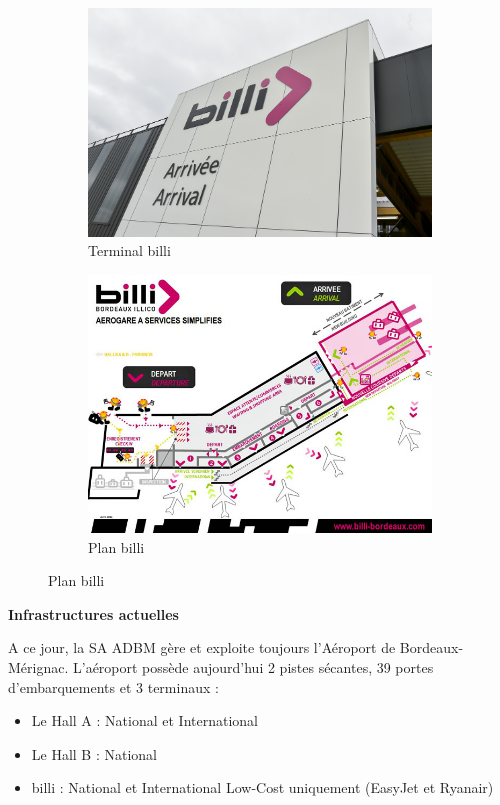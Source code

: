 \begin{figure}[hbt!]
    \begin{subfigure}{.5\textwidth}
      \centering
      \includegraphics[width=.7\linewidth]{Images/billiext.jpg}  
      \caption{Terminal billi}
      \label{fig:billiext}
    \end{subfigure}
    \begin{subfigure}{.5\textwidth}
      \centering
      \includegraphics[width=.7\linewidth]{Images/billi.jpg}  
      \caption{Plan billi}
      \label{fig:planBilli}
    \end{subfigure}
    \label{fig:travaux}
\end{figure}

\newpage

\textbf{Infrastructures actuelles}\newline


A ce jour, la SA ADBM gère et exploite toujours l'Aéroport de Bordeaux-Mérignac.
L'aéroport possède aujourd'hui 2 pistes sécantes, 39 portes d'embarquements et 3 terminaux :

\begin{itemize}
    \item Le Hall A : National et International
    \item Le Hall B : National
    \item billi : National et International Low-Cost uniquement (EasyJet et Ryanair)\newline
\end{itemize}

